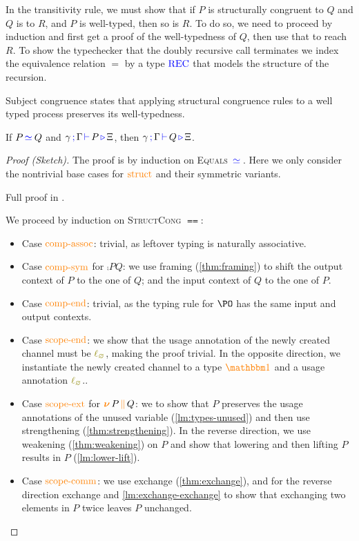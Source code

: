 In the transitivity rule, we must show that if $P$ is structurally congruent to $Q$ and $Q$ is to $R$, and $P$ is well-typed, then so is $R$.
To do so, we need to proceed by induction and first get a proof of the well-typedness of $Q$, then use that to reach $R$.
To show the typechecker that the doubly recursive call terminates we index the equivalence relation $=$ by a type $\textcolor{blue}{\operatorname{REC}}$ that models the structure of the recursion.

Subject congruence states that applying structural congruence rules to a well typed process preserves its well-typedness.
\begin{nitheorem}
  \label{thm:subject-congruence1}
  If $P \, \textcolor{blue}{\operatorname{\simeq}}_{} \, Q$ and $\gamma \, \textcolor{blue}{\operatorname{;}} \, \Gamma \, \textcolor{blue}{\operatorname{\vdash}} \, P \, \textcolor{blue}{\operatorname{\triangleright}} \, \Xi$, then $\gamma \, \textcolor{blue}{\operatorname{;}} \, \Gamma \, \textcolor{blue}{\operatorname{\vdash}} \, Q \, \textcolor{blue}{\operatorname{\triangleright}} \, \Xi$.
\end{nitheorem}

\begin{proof}[Proof (Sketch)]
  The proof is by induction on \textsc{Equals} $\, \textcolor{blue}{\operatorname{\simeq}}_{} \,$.
  Here we only consider the nontrivial base cases for $\textcolor{orange}{\operatorname{struct}}$ and their symmetric variants.
\begin{anonsuppress}
Full proof in \cite{Zalakain2020Agda}.
\end{anonsuppress}
  We proceed by induction on \textsc{StructCong} $\eqeq$:
  \begin{itemize}
    \item
      Case $\textcolor{orange}{\operatorname{comp-assoc}}$: trivial, as leftover typing is naturally associative.
    \item
      Case $\textcolor{orange}{\operatorname{comp-sym}}$ for $\comp{P}{Q}$: we use framing (\autoref{thm:framing}) to shift the output context of $P$ to the one of $Q$; and the input context of $Q$ to the one of $P$.
    \item
      Case $\textcolor{orange}{\operatorname{comp-end}}$: trivial, as the typing rule for $\PO$ has the same input and output contexts.
    \item
      Case $\textcolor{orange}{\operatorname{scope-end}}$: we show that the usage annotation of the newly created channel must be $\lz$, making the proof trivial.
      In the opposite direction, we instantiate the newly created channel to a type $\unit$ and a usage annotation $\lz$..
    \item
      Case $\textcolor{orange}{\operatorname{scope-ext}}$ for $\textcolor{orange}{\operatorname{\boldsymbol{\nu}}} \, P \, \textcolor{orange}{\operatorname{\parallel}} \, Q$: we to show that $P$ preserves the usage annotations of the unused variable (\autoref{lm:types-unused}) and then use strengthening (\autoref{thm:strengthening}).
      In the reverse direction, we use weakening (\autoref{thm:weakening}) on $P$ and show that lowering and then lifting $P$ results in $P$ (\autoref{lm:lower-lift}).
    \item
      Case $\textcolor{orange}{\operatorname{scope-comm}}$:
      we use exchange (\autoref{thm:exchange}), and for the reverse direction exchange and \autoref{lm:exchange-exchange} to show that exchanging two elements in $P$ twice leaves $P$ unchanged. \qedhere
  \end{itemize}
\end{proof}

